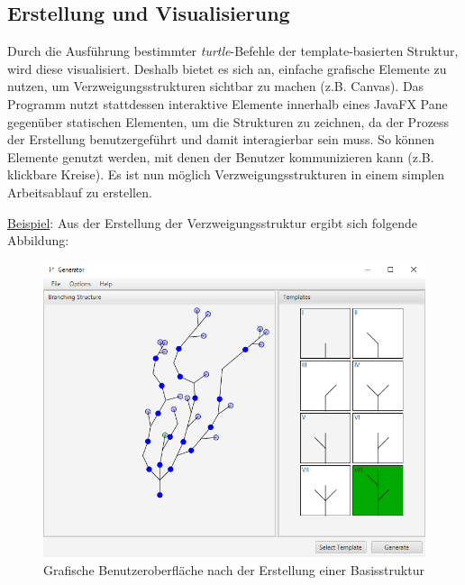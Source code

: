 \subsection*{Erstellung und Visualisierung}
Durch die Ausführung bestimmter \textit{turtle}-Befehle der template-basierten Struktur, wird diese visualisiert.
Deshalb bietet es sich an, einfache grafische Elemente zu nutzen, um Verzweigungsstrukturen sichtbar zu machen
(z.B. Canvas).
Das Programm nutzt stattdessen interaktive Elemente innerhalb eines JavaFX Pane gegenüber statischen Elementen, um
die Strukturen zu zeichnen, da der Prozess der Erstellung benutzergeführt und damit interagierbar sein muss.
So können Elemente genutzt werden, mit denen der Benutzer kommunizieren kann (z.B. klickbare Kreise).
Es ist nun möglich Verzweigungsstrukturen in einem simplen Arbeitsablauf zu erstellen.

\newpage

\underline{Beispiel}: Aus der Erstellung der Verzweigungsstruktur ergibt sich folgende Abbildung:
\begin{figure}[H]
    \centering
    \includegraphics[width=12cm]{../images/evaluierung_inferrieren.png}
    \caption{Grafische Benutzeroberfläche nach der Erstellung einer Basisstruktur}
\end{figure}

